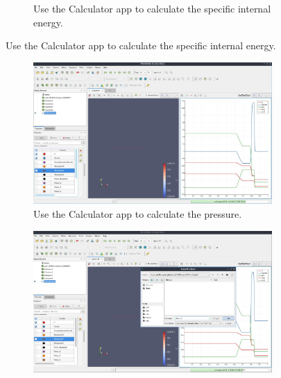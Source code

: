 \begin{appendices}
\begin{figure}
\begin{subfigure}{.95\textwidth}
  \caption{Use the Calculator app to calculate the specific internal energy.}
  \label{fig:POL2}
\end{subfigure}
\end{figure}
\begin{figure}\ContinuedFloat
\centering
\begin{subfigure}{.95\textwidth}
  \centering
  \includegraphics[width=.9\linewidth,height=0.9\linewidth,scale=1]{figures/paraviewGrabs/POL3.jpg}
  \caption{Use the Calculator app to calculate the pressure.}
  \label{fig:POL3}
\end{subfigure}
\begin{subfigure}{.95\textwidth}
  \centering
  \includegraphics[width=.9\linewidth,height=0.9\linewidth,scale=1]{figures/paraviewGrabs/POL4.jpg}

\end{subfigure}
\end{figure}
\end{appendices}
